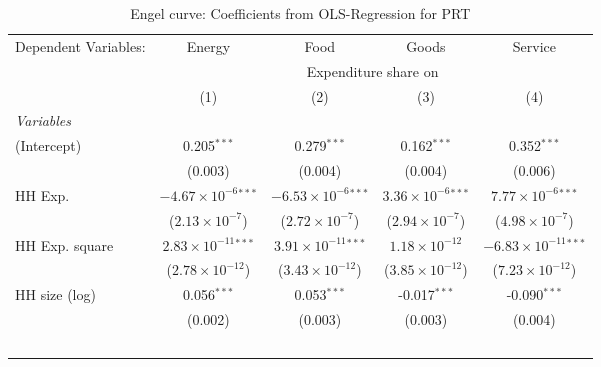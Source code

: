 
\begin{table}[htbp!]
   \centering
   \small
   \begin{adjustbox}{width = 1\textwidth, max height = 0.95\textheight, center}
      \begin{threeparttable}[b]
         \caption{\label{tab:Engel_parametric_PRT} Engel curve: Coefficients from OLS-Regression for PRT}
         \begin{tabular}{lcccc}
            \tabularnewline \midrule \midrule
            Dependent Variables: & Energy                         & Food                           & Goods                         & Service\\  
             & \multicolumn{4}{c}{Expenditure share on} \\ 
                                 & (1)                            & (2)                            & (3)                           & (4)\\  
            \midrule
            \emph{Variables}\\
            (Intercept)          & 0.205$^{***}$                  & 0.279$^{***}$                  & 0.162$^{***}$                 & 0.352$^{***}$\\   
                                 & (0.003)                        & (0.004)                        & (0.004)                       & (0.006)\\   
            HH Exp.              & $-4.67\times 10^{-6}$$^{***}$  & $-6.53\times 10^{-6}$$^{***}$  & $3.36\times 10^{-6}$$^{***}$  & $7.77\times 10^{-6}$$^{***}$\\    
                                 & ($2.13\times 10^{-7}$)         & ($2.72\times 10^{-7}$)         & ($2.94\times 10^{-7}$)        & ($4.98\times 10^{-7}$)\\    
            HH Exp. square       & $2.83\times 10^{-11}$$^{***}$  & $3.91\times 10^{-11}$$^{***}$  & $1.18\times 10^{-12}$         & $-6.83\times 10^{-11}$$^{***}$\\    
                                 & ($2.78\times 10^{-12}$)        & ($3.43\times 10^{-12}$)        & ($3.85\times 10^{-12}$)       & ($7.23\times 10^{-12}$)\\    
            HH size (log)        & 0.056$^{***}$                  & 0.053$^{***}$                  & -0.017$^{***}$                & -0.090$^{***}$\\   
                                 & (0.002)                        & (0.003)                        & (0.003)                       & (0.004)\\   
$$
\end{tabular}
\end{threeparttable}
\end{adjustbox}
\end{table}
